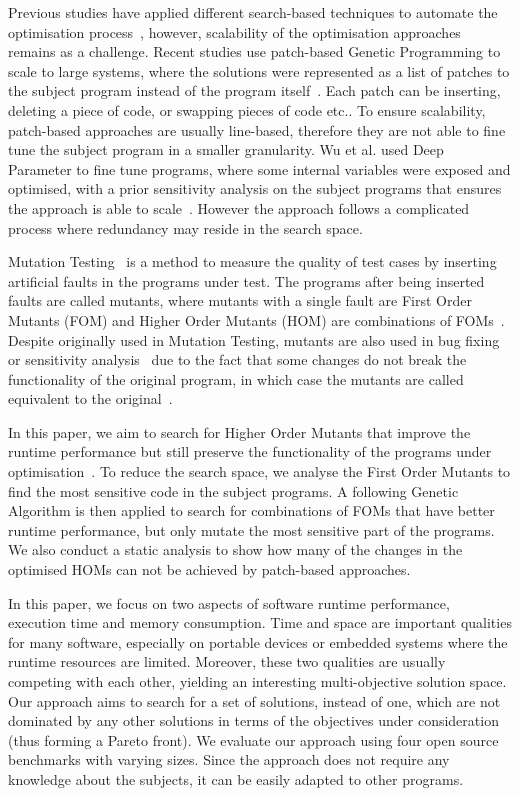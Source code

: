 \documentclass[oribibl]{llncs}
\begin{document}
Previous studies have applied different search-based techniques to automate the optimisation process~\cite{arcuri-ssbse-2011, 6035728,Brake:2008:ADS:1370018.1370031,hutter2009paramils}, however, scalability of the optimisation approaches remains as a challenge.
Recent studies use patch-based Genetic Programming to scale to large systems, where the solutions were represented as a list of patches to the subject program instead of the program itself~\cite{Bruce:2015:REC:2739480.2754752,geneticimprovementJP}.
Each patch can be inserting, deleting a piece of code, or swapping pieces of code etc..
To ensure scalability, patch-based approaches are usually line-based, therefore they are not able to fine tune the subject program in a smaller granularity. 
Wu et al. used Deep Parameter to fine tune programs, where some internal variables were exposed and optimised, with a prior sensitivity analysis on the subject programs that ensures the approach is able to scale~\cite{Wu:2015:DPO:2739480.2754648}.
However the approach follows a complicated process where redundancy may reside in the search space.

Mutation Testing~\cite{demillo1978hints,5487526} is a method to measure the quality of test cases by inserting artificial faults in the programs under test.
The programs after being inserted faults are called mutants, where mutants with a single fault are First Order Mutants (FOM) and Higher Order Mutants (HOM) are combinations of FOMs~\cite{Harman:2011:SHO:2025113.2025144}.
Despite originally used in Mutation Testing, mutants are also used in bug fixing~\cite{6035728} or sensitivity analysis~\cite{Wu:2015:DPO:2739480.2754648} due to the fact that some changes do not break the functionality of the original program, in which case the mutants are called equivalent to the original~\cite{weimerGPEM14}.

In this paper, we aim to search for Higher Order Mutants that improve the runtime performance but still preserve the functionality of the programs under optimisation~\cite{Jia:2015:GIU:2739482.2768417}.
To reduce the search space, we analyse the First Order Mutants to find the most sensitive code in the subject programs.
A following Genetic Algorithm is then applied to search for combinations of FOMs that have better runtime performance, but only mutate the most sensitive part of the programs.
We also conduct a static analysis to show how many of the changes in the optimised HOMs can not be achieved by patch-based approaches.

In this paper, we focus on two aspects of software runtime performance, execution time and memory consumption.
Time and space are important qualities for many software, especially on portable devices or embedded systems where the runtime resources are limited.
Moreover, these two qualities are usually competing with each other, yielding an interesting multi-objective solution space.
Our approach aims to search for a set of solutions, instead of one, which are not dominated by any other solutions in terms of the objectives under consideration (thus forming a Pareto front).
We evaluate our approach using four open source benchmarks with varying sizes. 
Since the approach does not require any knowledge about the subjects, it can be easily adapted to other programs.
\end{document}
